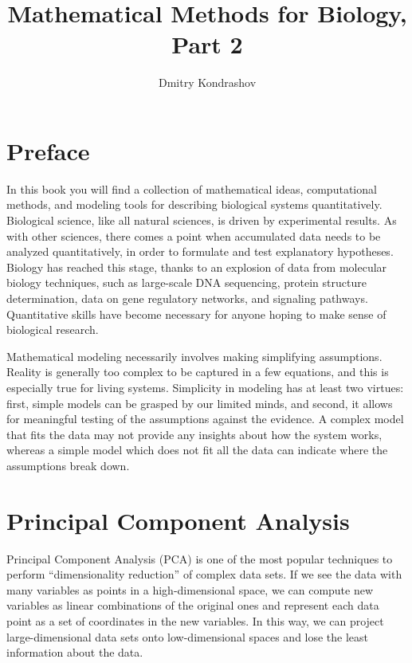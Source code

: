 \documentclass[
  letterpaper,
  DIV=11,
  numbers=noendperiod]{scrreprt}
\title{Mathematical Methods for Biology, Part 2}
\author{Dmitry Kondrashov}
\date{}
\renewcommand*\contentsname{Table of contents}
\newcommand\contentsname{Table of contents}
\begin{document}
\maketitle

\renewcommand*\contentsname{Table of contents}
{
\hypersetup{linkcolor=}
\setcounter{tocdepth}{2}
\tableofcontents
}

\chapter*{Preface}\label{preface}


In this book you will find a collection of mathematical ideas,
computational methods, and modeling tools for describing biological
systems quantitatively. Biological science, like all natural sciences,
is driven by experimental results. As with other sciences, there comes a
point when accumulated data needs to be analyzed quantitatively, in
order to formulate and test explanatory hypotheses. Biology has reached
this stage, thanks to an explosion of data from molecular biology
techniques, such as large-scale DNA sequencing, protein structure
determination, data on gene regulatory networks, and signaling pathways.
Quantitative skills have become necessary for anyone hoping to make
sense of biological research.

Mathematical modeling necessarily involves making simplifying
assumptions. Reality is generally too complex to be captured in a few
equations, and this is especially true for living systems. Simplicity in
modeling has at least two virtues: first, simple models can be grasped
by our limited minds, and second, it allows for meaningful testing of
the assumptions against the evidence. A complex model that fits the data
may not provide any insights about how the system works, whereas a
simple model which does not fit all the data can indicate where the
assumptions break down.


\chapter{Principal Component
Analysis}\label{principal-component-analysis}

Principal Component Analysis (PCA) is one of the most popular techniques
to perform ``dimensionality reduction'' of complex data sets. If we see
the data with many variables as points in a high-dimensional space, we
can compute new variables as linear combinations of the original ones
and represent each data point as a set of coordinates in the new
variables. In this way, we can project large-dimensional data sets onto
low-dimensional spaces and lose the least information about the data.
\end{document}
